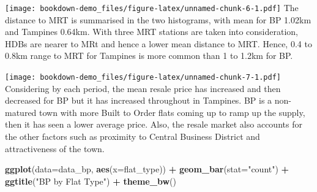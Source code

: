 \documentclass[]{book}
\newenvironment{Shaded}{\begin{snugshade}}{\end{snugshade}}
\newcommand{\KeywordTok}[1]{\textcolor[rgb]{0.13,0.29,0.53}{\textbf{#1}}}
\newcommand{\DataTypeTok}[1]{\textcolor[rgb]{0.13,0.29,0.53}{#1}}
\newcommand{\DecValTok}[1]{\textcolor[rgb]{0.00,0.00,0.81}{#1}}
\newcommand{\FloatTok}[1]{\textcolor[rgb]{0.00,0.00,0.81}{#1}}
\newcommand{\StringTok}[1]{\textcolor[rgb]{0.31,0.60,0.02}{#1}}
\newcommand{\OperatorTok}[1]{\textcolor[rgb]{0.81,0.36,0.00}{\textbf{#1}}}
\newcommand{\NormalTok}[1]{#1}
\begin{document}
\begin{Shaded}
\end{Shaded}

\texttt{[image: bookdown-demo\_files/figure-latex/unnamed-chunk-6-1.pdf]}
The distance to MRT is summarised in the two histograms, with mean for
BP 1.02km and Tampines 0.64km. With three MRT stations are taken into
consideration, HDBs are nearer to MRt and hence a lower mean distance to
MRT. Hence, 0.4 to 0.8km range to MRT for Tampines is more common than 1
to 1.2km for BP.

\begin{Shaded}
\end{Shaded}

\texttt{[image: bookdown-demo\_files/figure-latex/unnamed-chunk-7-1.pdf]}
Considering by each period, the mean resale price has increased and then
decreased for BP but it has increased throughout in Tampines. BP is a
non-matured town with more Built to Order flats coming up to ramp up the
supply, then it has seen a lower average price. Also, the resale market
also accounts for the other factors such as proximity to Central
Business District and attractiveness of the town.

\begin{Shaded}
\begin{Highlighting}[]
\KeywordTok{ggplot}\NormalTok{(}\DataTypeTok{data=}\NormalTok{data_bp, }\KeywordTok{aes}\NormalTok{(}\DataTypeTok{x=}\NormalTok{flat_type)) }\OperatorTok{+}
\StringTok{    }\KeywordTok{geom_bar}\NormalTok{(}\DataTypeTok{stat=}\StringTok{"count"}\NormalTok{) }\OperatorTok{+}\StringTok{ }\KeywordTok{ggtitle}\NormalTok{(}\StringTok{"BP by Flat Type"}\NormalTok{) }\OperatorTok{+}
\StringTok{    }\KeywordTok{theme_bw}\NormalTok{()}
\end{Highlighting}
\end{Shaded}
\end{document}
